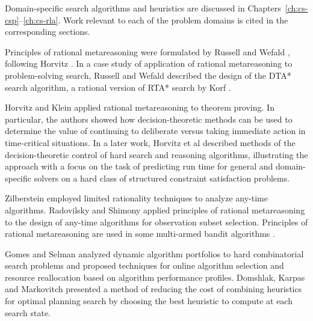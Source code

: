 Domain-specific search algorithms and heuristics are discussed in 
Chapters~\ref{ch:cs-csp}--\ref{ch:cs-rla}. Work relevant to each of
the problem domains is cited in the corresponding sections. 

Principles of rational metareasoning were formulated by Russell and
Wefald \cite{Russell.right}, following Horvitz
\cite{Horvitz.reasoningabout}. In a case study of application of rational
metareasoning to problem-solving search, Russell and Wefald
\cite{Russell.right} described the design of the DTA* search algorithm,
a rational version of RTA* search by Korf \cite{Korf.rta}.

Horvitz and Klein \cite{Horvitz.proving} applied rational
metareasoning to theorem proving. In particular, the authors showed
how decision-theoretic methods can be used to determine the value of
continuing to deliberate versus taking immediate action in
time-critical situations. In a later work, Horvitz et al
\cite{Horvitz.bayesian} described methods of the
decision-theoretic control of hard search and reasoning algorithms,
illustrating the approach with a focus on the task of predicting run
time for general and domain-specific solvers on a hard class of
structured constraint satisfaction problems.

Zilberstein \cite{Zilberstein.PHD} employed limited rationality
techniques to analyze any-time algorithms. Radovilsky and Shimony
\cite{Radovilsky.oss} applied principles of rational metareasoning to
the design of any-time algorithms for observation subset
selection. Principles of rational metareasoning are used in some
multi-armed bandit algorithms \cite{Vermorel.bandits}.

Gomes and Selman \cite{Gomes.portfolio} analyzed dynamic algorithm
portfolios to hard combinatorial search problems and proposed
techniques for online algorithm selection and resource reallocation
based on algorithm performance profiles. Domshlak, Karpas and
Markovitch \cite{Domshlak.maxornot} presented a method of reducing the
cost of combining heuristics for optimal planning search by choosing
the best heuristic to compute at each search state.
